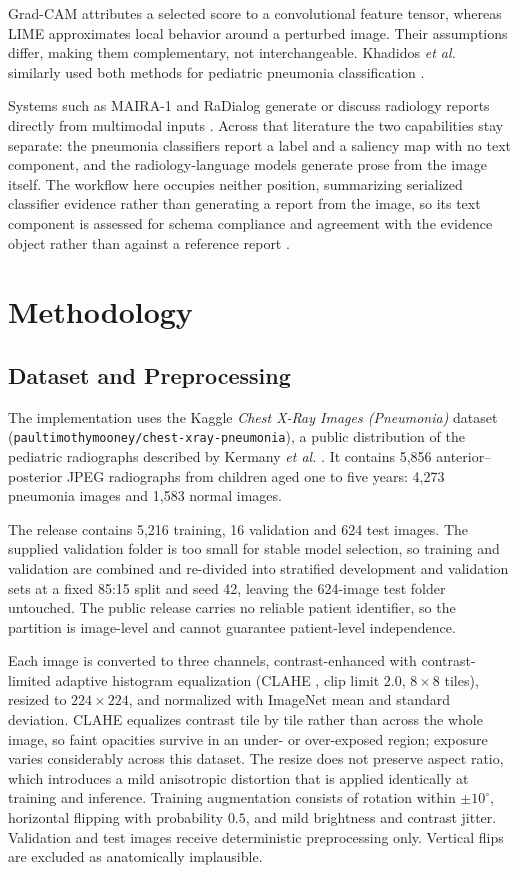 \documentclass[conference]{IEEEtran}
\begin{document}
Grad-CAM attributes a selected score to a convolutional feature tensor, whereas LIME approximates local behavior around a perturbed image. Their assumptions differ, making them complementary, not interchangeable. Khadidos \emph{et al.} similarly used both methods for pediatric pneumonia classification \cite{khadidos2026explainable}.

Systems such as MAIRA-1 and RaDialog generate or discuss radiology reports directly from multimodal inputs \cite{hyland2023maira,pellegrini2026radialog}. Across that literature the two capabilities stay separate: the pneumonia classifiers report a label and a saliency map with no text component, and the radiology-language models generate prose from the image itself. The workflow here occupies neither position, summarizing serialized classifier evidence rather than generating a report from the image, so its text component is assessed for schema compliance and agreement with the evidence object rather than against a reference report \cite{ostmeier2024green}.



\section{Methodology}
\label{sec:method}
\subsection{Dataset and Preprocessing}
The implementation uses the Kaggle \emph{Chest X-Ray Images (Pneumonia)} dataset (\texttt{paultimothymooney/chest-xray-pneumonia}), a public distribution of the pediatric radiographs described by Kermany \emph{et al.} \cite{kermany2018identifying}. It contains 5,856 anterior--posterior JPEG radiographs from children aged one to five years: 4,273 pneumonia images and 1,583 normal images. 

The release contains 5,216 training, 16 validation and 624 test images. The supplied validation folder is too small for stable model selection, so training and validation are combined and re-divided into stratified development and validation sets at a fixed 85:15 split and seed 42, leaving the 624-image test folder untouched. The public release carries no reliable patient identifier, so the partition is image-level and cannot guarantee patient-level independence.

Each image is converted to three channels, contrast-enhanced with contrast-limited adaptive histogram equalization (CLAHE \cite{zuiderveld1994clahe}, clip limit $2.0$, $8\times8$ tiles), resized to $224\times224$, and normalized with ImageNet mean and standard deviation. CLAHE equalizes contrast tile by tile rather than across the whole image, so faint opacities survive in an under- or over-exposed region; exposure varies considerably across this dataset. The resize does not preserve aspect ratio, which introduces a mild anisotropic distortion that is applied identically at training and inference. Training augmentation consists of rotation within $\pm10^{\circ}$, horizontal flipping with probability $0.5$, and mild brightness and contrast jitter. Validation and test images receive deterministic preprocessing only. Vertical flips are excluded as anatomically implausible.
\end{document}
